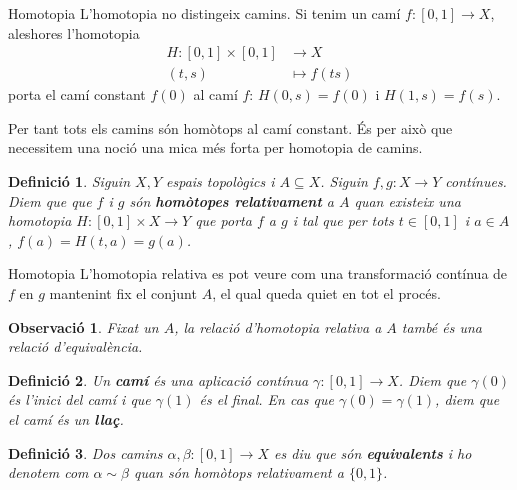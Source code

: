 \documentclass{beamer}
\newtheorem{definicio}{Definici\'{o}}
\newtheorem{observacio}{Observaci\'{o}}
\theoremstyle{definition}
\begin{document}
\begin{frame}{Homotopia}
L'homotopia no distingeix camins. Si tenim un cam\'{i} $f:[0,1]\rightarrow X$, aleshores l'homotopia
\begin{align*}
H:[0,1]\times[0,1]&\longrightarrow X\\
(t,s)&\longmapsto f(ts)
\end{align*}
porta el cam\'{i} constant $f(0)$ al cam\'{i} $f$: $H(0,s)=f(0)$ i $H(1,s)=f(s)$.
\pause

Per tant tots els camins s\'{o}n hom\`{o}tops al cam\'{i} constant. \'{E}s per aix\`{o} que necessitem una noci\'{o} una mica m\'{e}s forta per homotopia de camins.
\pause

\begin{definicio}
Siguin $X,Y$ espais topol\`{o}gics i $A\subseteq X$. Siguin $f,g:X\rightarrow Y$ cont\'{i}nues. Diem que que $f$ i $g$ s\'{o}n \textbf{hom\`{o}topes relativament} a $A$ quan existeix una homotopia $H:[0,1]\times X\rightarrow Y$ que porta $f$ a $g$ i tal que per tots $t\in[0,1]$ i $a\in A$, $f(a)=H(t,a)=g(a)$.
\end{definicio}
\end{frame}

\begin{frame}{Homotopia}
L'homotopia relativa es pot veure com una transformaci\'{o} cont\'{i}nua de $f$ en $g$ mantenint fix el conjunt $A$, el qual queda quiet en tot el proc\'{e}s.
\pause

\begin{observacio}
Fixat un $A$, la relaci\'{o} d'homotopia relativa a $A$ tamb\'{e} \'{e}s una relaci\'{o} d'equival\`{e}ncia.
\end{observacio}
\pause

\begin{definicio}
Un \textbf{cam\'{i}} \'{e}s una aplicaci\'{o} cont\'{i}nua $\gamma:[0,1]\rightarrow X$. Diem que $\gamma(0)$ \'{e}s l'inici del cam\'{i} i que $\gamma(1)$ \'{e}s el final. En cas que $\gamma(0)=\gamma(1)$, diem que el cam\'{i} \'{e}s un \textbf{lla\c{c}}.
\end{definicio}
\pause

\begin{definicio}
Dos camins $\alpha,\beta:[0,1]\rightarrow X$ es diu que s\'{o}n \textbf{equivalents} i ho denotem com $\alpha\sim\beta$ quan s\'{o}n hom\`{o}tops relativament a $\{0,1\}$. 
\end{definicio}

\end{frame}
\end{document}

